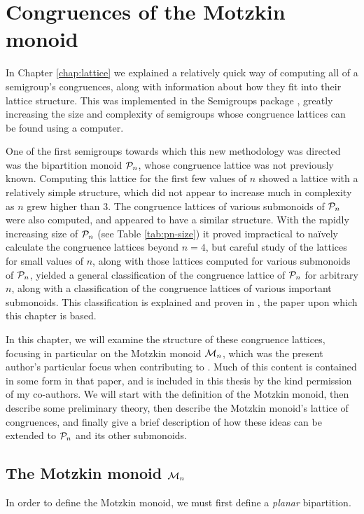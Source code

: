 \chapter{Congruences of the Motzkin monoid}
\label{chap:motzkin}

In Chapter \ref{chap:lattice} we explained a relatively quick way of computing
all of a semigroup's congruences, along with information about how they fit into
their lattice structure.  This was implemented in the Semigroups package
\cite{semigroups}, greatly increasing the size and complexity of semigroups
whose congruence lattices can be found using a computer.

One of the first semigroups towards which this new methodology was directed was
the bipartition monoid $\mathcal{P}_n$, whose congruence lattice was not previously
known.  Computing this lattice for the first few values of $n$ showed a lattice
with a relatively simple structure, which did not appear to increase much in
complexity as $n$ grew higher than $3$.  The congruence lattices of various
submonoids of $\mathcal{P}_n$ were also computed, and appeared to have a similar
structure.  With the rapidly increasing size of $\mathcal{P}_n$ (see Table
\ref{tab:pn-size}) it proved impractical to na\"ively calculate the congruence
lattices beyond $n=4$, but careful study of the lattices for small values of
$n$, along with those lattices computed for various submonoids of $\mathcal{P}_n$,
yielded a general classification of the congruence lattice of $\mathcal{P}_n$ for
arbitrary $n$, along with a classification of the congruence lattices of various
important submonoids.  This classification is explained and proven in
\cite{ourpaper}, the paper upon which this chapter is based.

In this chapter, we will examine the structure of these congruence lattices,
focusing in particular on the Motzkin monoid $\mathcal{M}_n$, which was the present
author's particular focus when contributing to \cite{ourpaper}.  Much of this
content is contained in some form in that paper, and is included in this
thesis by the kind permission of my co-authors.  We will start
with the definition of the Motzkin monoid, then describe some preliminary
theory, then describe the Motzkin monoid's lattice of congruences, and
finally give a brief description of how these ideas can be extended to $\mathcal{P}_n$
and its other submonoids.

\section{The Motzkin monoid $\mathcal{M}_n$}
\label{sec:motzkin-monoid}
In order to define the Motzkin monoid, we must first define a \textit{planar}
bipartition.

